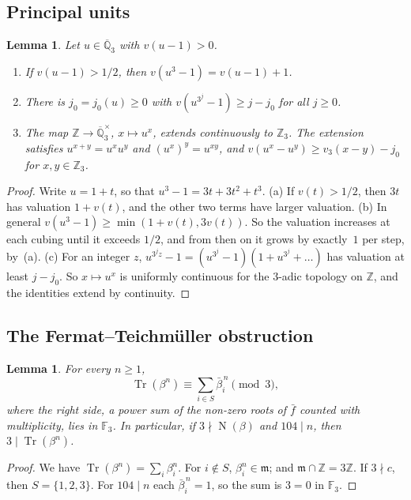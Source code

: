 \documentclass[11pt,a4paper]{article}
\newtheorem{lemma}[theorem]{Lemma}
\theoremstyle{definition}
\theoremstyle{remark}
\newcommand{\Z}{\mathbb{Z}}
\newcommand{\F}{\mathbb{F}}
\newcommand{\Qtbar}{\overline{\mathbb{Q}}_3}
\DeclareMathOperator{\Tr}{Tr}
\DeclareMathOperator{\Nm}{N}
\begin{document}
\subsection{Principal units}
\begin{lemma}\label{lem:units}
Let $u\in\Qtbar$ with $v(u-1)>0$.
\begin{enumerate}[label=\textup{(\alph*)}]
\item If $v(u-1)>1/2$, then $v(u^3-1)=v(u-1)+1$.
\item There is $j_0=j_0(u)\ge0$ with $v(u^{3^j}-1)\ge j-j_0$ for all $j\ge0$.
\item The map $\Z\to\Qtbar^\times$, $x\mapsto u^x$, extends continuously to $\Z_3$. The extension satisfies $u^{x+y}=u^xu^y$ and $(u^x)^y=u^{xy}$, and $v(u^x-u^y)\ge v_3(x-y)-j_0$ for $x,y\in\Z_3$.
\end{enumerate}
\end{lemma}
\begin{proof}
Write $u=1+t$, so that $u^3-1=3t+3t^2+t^3$.
(a) If $v(t)>1/2$, then $3t$ has valuation $1+v(t)$, and the other two terms have larger valuation.
(b) In general $v(u^3-1)\ge\min(1+v(t),3v(t))$. So the valuation increases at each cubing until it exceeds $1/2$, and from then on it grows by exactly~$1$ per step, by~(a).
(c) For an integer $z$, $u^{3^jz}-1=(u^{3^j}-1)(1+u^{3^j}+\dots)$ has valuation at least $j-j_0$. So $x\mapsto u^x$ is uniformly continuous for the $3$-adic topology on $\Z$, and the identities extend by continuity.
\end{proof}

\subsection{The Fermat--Teichm\"uller obstruction}
\begin{lemma}\label{lem:fermat}
For every $n\ge1$,
\[
 \Tr(\beta^n)\equiv\sum_{i\in S}\bar\beta_i^{\,n}\pmod3,
\]
where the right side, a power sum of the non-zero roots of $\bar f$ counted with multiplicity, lies in $\F_3$.
In particular, if $3\nmid\Nm(\beta)$ and $104\mid n$, then $3\mid\Tr(\beta^n)$.
\end{lemma}
\begin{proof}
We have $\Tr(\beta^n)=\sum_i\beta_i^n$. For $i\notin S$, $\beta_i^n\in\mathfrak m$; and $\mathfrak m\cap\Z=3\Z$.
If $3\nmid c$, then $S=\{1,2,3\}$. For $104\mid n$ each $\bar\beta_i^{\,n}=1$, so the sum is $3=0$ in $\F_3$.
\end{proof}
\end{document}
